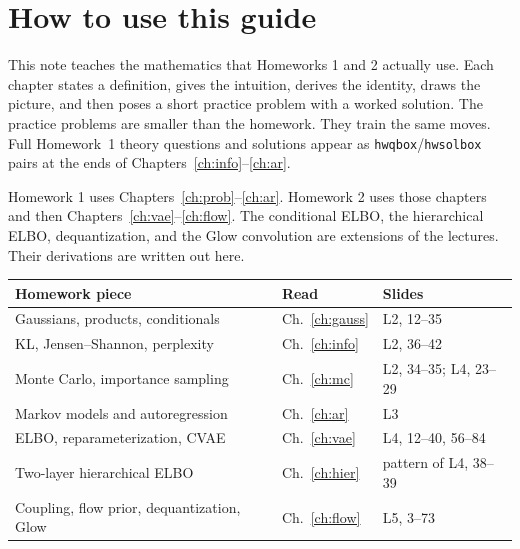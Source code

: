 \chapter{How to use this guide}
\label{ch:map}

This note teaches the mathematics that Homeworks 1 and 2 actually use. Each chapter states a definition, gives the intuition, derives the identity, draws the picture, and then poses a short practice problem with a worked solution. The practice problems are smaller than the homework. They train the same moves. Full Homework~1 theory questions and solutions appear as \texttt{hwqbox}/\texttt{hwsolbox} pairs at the ends of Chapters~\ref{ch:info}--\ref{ch:ar}.

\begin{intbox}
Homework 1 uses Chapters~\ref{ch:prob}--\ref{ch:ar}. Homework 2 uses those chapters and then Chapters~\ref{ch:vae}--\ref{ch:flow}. The conditional ELBO, the hierarchical ELBO, dequantization, and the Glow convolution are extensions of the lectures. Their derivations are written out here.
\end{intbox}

\begin{center}
\renewcommand{\arraystretch}{1.25}
\begin{tabularx}{\textwidth}{@{}lXl@{}}
\toprule
\textbf{Homework piece} & \textbf{Read} & \textbf{Slides}\\
\midrule
Gaussians, products, conditionals & Ch.~\ref{ch:gauss} & L2, 12--35\\
KL, Jensen--Shannon, perplexity & Ch.~\ref{ch:info} & L2, 36--42\\
Monte Carlo, importance sampling & Ch.~\ref{ch:mc} & L2, 34--35; L4, 23--29\\
Markov models and autoregression & Ch.~\ref{ch:ar} & L3\\
ELBO, reparameterization, CVAE & Ch.~\ref{ch:vae} & L4, 12--40, 56--84\\
Two-layer hierarchical ELBO & Ch.~\ref{ch:hier} & pattern of L4, 38--39\\
Coupling, flow prior, dequantization, Glow & Ch.~\ref{ch:flow} & L5, 3--73\\
\bottomrule
\end{tabularx}
\end{center}

